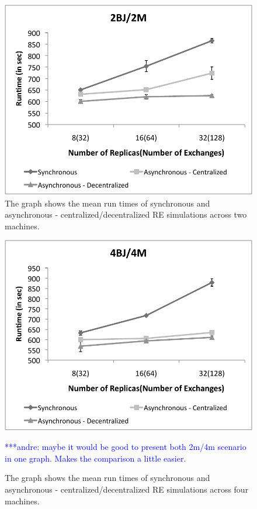\documentclass{rspublic}
\newcommand{\alnote}[1]{ {\textcolor{blue} { ***andre: #1 }}}
\newcommand{\alnote}[1]{}
\begin{document}
%
\begin{figure}
\centering
\includegraphics[scale=0.80]{2Machines.pdf}
\caption{\small The graph shows the mean run times of synchronous and asynchronous - centralized/decentralized RE simulations across two machines.}
\label{fig:2machines}
\vspace{-1em}
\end{figure}

\begin{figure}
\centering
\includegraphics[scale=0.80]{4Machines.pdf}
\caption{\small The graph shows the mean run times of synchronous and asynchronous - centralized/decentralized RE simulations across four machines.}
\alnote{maybe it would be good to present both 2m/4m scenario in one graph. Makes the comparison a little easier.}
\label{fig:4machines}
\vspace{-1em}
\end{figure}
\end{document}
